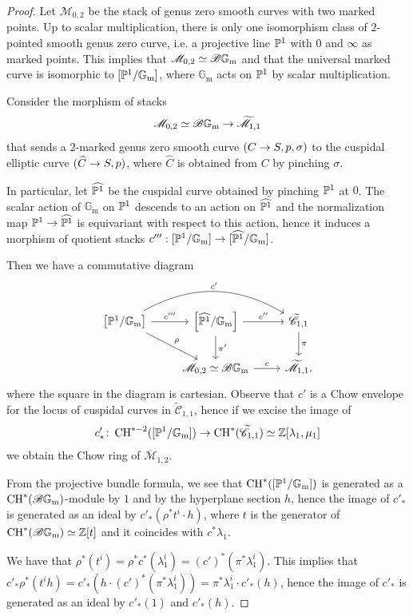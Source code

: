 \documentclass[a4paper, 10pt]{amsart}
\numberwithin{equation}{section}
\numberwithin{subsection}{section}
\theoremstyle{definition}
\theoremstyle{remark}
\renewcommand{\mathcal}{\mathscr}
\newcommand\cM{\mathcal{M}} \newcommand\cN{\mathcal{N}}
\newcommand\GG{\mathbb{G}} \newcommand\HH{\mathbb{H}}
\newcommand\rmm{\mathrm{m}} \newcommand\rmn{\mathrm{n}}
\newcommand\arr{\ifinner\to\else\longrightarrow\fi}
\newcommand{\gm}{\GG_{\rmm}}
\newcommand{\Mbar}{\overline{\cM}}
\newcommand{\Mtilde}{\widetilde{\mathcal M}}
\newcommand{\Ctilde}{\widetilde{\mathcal C}}
\newcommand{\ch}[1][*]{\operatorname{CH}^{#1}}
\begin{document}
	
	\begin{proof}
	    Let $\cM_{0,2}$ be the stack of genus zero smooth curves with two marked points. Up to scalar multiplication, there is only one isomorphism class of $2$-pointed smooth genus zero curve, i.e. a projective line $\mathbb{P}^1$ with $0$ and $\infty$ as marked points. This implies that $\cM_{0,2}\simeq\cB\gm$ and that the universal marked curve is isomorphic to $[\PP^1/\gm]$, where $\gm$ acts on $\mathbb{P}^1$ by scalar multiplication.
		
		Consider the morphism of stacks
		\[ \cM_{0,2} \simeq \cB\gm \arr \Mtilde_{1,1} \]
		that sends a $2$-marked genus zero smooth curve $(C\arr S,p,\sigma)$ to the cuspidal elliptic curve $(\widehat{C} \arr S,p)$, where $\widehat{C}$ is obtained from $C$ by pinching $\sigma$. 
		
		In particular, let $\widehat{\mathbb{P}^1}$ be the cuspidal curve obtained by pinching $\mathbb{P}^1$ at $0$. The scalar action of $\gm$ on $\mathbb{P}^1$ descends to an action on $\widehat{\mathbb{P}^1}$ and the normalization map $\mathbb{P}^1\to\widehat{\mathbb{P}^1}$ is equivariant with respect to this action, hence it induces a morphism of quotient stacks $c''':[\PP^1/\gm]\to [\widehat{\PP^1}/\gm]$.
		
		Then we have a commutative diagram
		\[ 
		\begin{tikzcd}
			\left[ \PP^1/\gm \right] \ar[r, "c'''"] \ar[dr, "\rho"] \ar[rr, bend left, "c'"]  & {\left[\widehat{\PP^1}/\gm\right]} \ar[r, "c''"] \ar[d, "\pi'"] & \Ctilde_{1,1} \ar[d, "\pi"] \\
			& \cM_{0,2}\simeq\cB\gm \ar[r, "c"] & \Mtilde_{1,1}.
		\end{tikzcd}
		\]
		where the square in the diagram is cartesian.
		Observe that $c'$ is a Chow envelope for the locus of cuspidal curves in $\Ctilde_{1,1}$, hence if we excise the image of
		\begin{equation}\label{eq:c} 
		c'_*\colon\operatorname{CH}^{*-2}([\PP^1/\gm]) \arr \ch(\Ctilde_{1,1})\simeq \ZZ[\lambda_1,\mu_1]
		 \end{equation}
		we obtain the Chow ring of $\Mbar_{1,2}$.

		From the projective bundle formula, we see that $\ch([\PP^1/\gm])$ is generated as a $\ch(\cB\gm)$-module by $1$ and by the hyperplane section $h$, hence the image of $c'_*$ is generated as an ideal by $c'_*(\rho^*t^i\cdot h)$, where $t$ is the generator of $\ch(\cB\gm)\simeq \ZZ[t]$ and it coincides with $c^*\lambda_1$.
		
		We have that $\rho^*(t^i)=\rho^*c^*(\lambda_1^i) = (c')^*(\pi^*\lambda_1^i)$. This implies that $c'_*\rho^*(t^ih)=c'_*(h\cdot(c')^*(\pi^*\lambda_1^i))=\pi^*\lambda_1^i\cdot c'_*(h)$, hence the image of $c'_*$ is generated as an ideal by $c'_*(1)$ and $c'_*(h)$. 
		

\end{proof}
\end{document}
